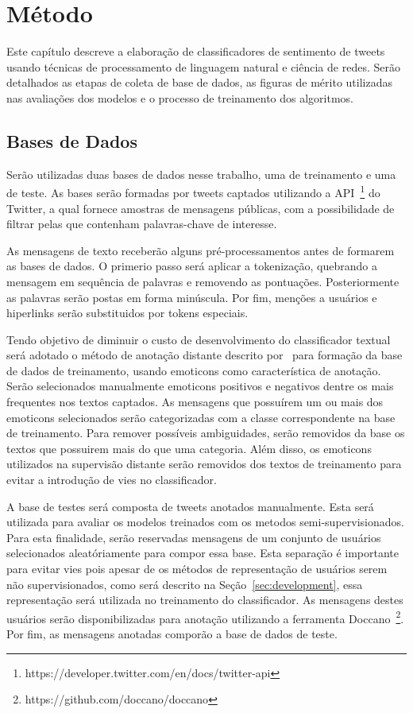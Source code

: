\chapter{Método}
\label{chapter:method}

Este capítulo descreve a elaboração de classificadores de sentimento de tweets
usando técnicas de processamento de linguagem natural e ciência de redes.
Serão detalhados as etapas de coleta de base de dados, as figuras de mérito
utilizadas nas avaliações dos modelos e o processo de treinamento dos
algoritmos.

\section{Bases de Dados}

Serão utilizadas duas bases de dados nesse trabalho, uma de treinamento e uma de
teste.
As bases serão formadas por tweets captados utilizando a
API~\footnote{https://developer.twitter.com/en/docs/twitter-api} do Twitter,
a qual fornece amostras de mensagens públicas, com a possibilidade de filtrar
pelas que contenham palavras-chave de interesse.

As mensagens de texto receberão alguns pré-processamentos antes de formarem as
bases de dados.
O primerio passo será aplicar a tokenização, quebrando a mensagem em sequência
de palavras e removendo as pontuações.
Posteriormente as palavras serão postas em forma minúscula.
Por fim, menções a usuários e hiperlinks serão substituidos por tokens especiais.

Tendo objetivo de diminuir o custo de desenvolvimento do classificador textual será
adotado o método de anotação distante descrito por~\citet{go09} para formação da
base de dados de treinamento, usando emoticons como característica de anotação.
Serão selecionados manualmente emoticons positivos e negativos dentre os mais
frequentes nos textos captados.
As mensagens que possuírem um ou mais dos emoticons selecionados serão
categorizadas com a classe correspondente na base de treinamento.
Para remover possíveis ambiguidades, serão removidos da base os textos que
possuirem mais do que uma categoria.
Além disso, os emoticons utilizados na supervisão distante serão removidos dos
textos de treinamento para evitar a introdução de vies no classificador.

A base de testes será composta de tweets anotados manualmente.
Esta será utilizada para avaliar os modelos treinados com os metodos
semi-supervisionados.
Para esta finalidade, serão reservadas mensagens de um conjunto de usuários
selecionados aleatóriamente para compor essa base.
Esta separação é importante para evitar vies pois apesar de os métodos de
representação de usuários serem não supervisionados, como será descrito na
Seção~\ref{sec:development}, essa representação será utilizada no treinamento do
classificador.
As mensagens destes usuários serão disponibilizadas para anotação utilizando a
ferramenta Doccano~\footnote{https://github.com/doccano/doccano}.
Por fim, as mensagens anotadas comporão a base de dados de teste.

